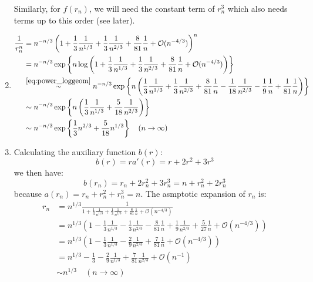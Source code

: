 \begin{solution}
\begin{enumerate}[label=(\alph*)]
        Similarly, for $f(r_n)$, we will need the constant term of $r_n^3$ which also needs terms up to this order (see later).
        \item \begin{align*}
            \frac{1}{r_n^n} &= n^{-n/3} \left(1 + \frac{1}{3}\frac{1}{n^{1/3}}+\frac{1}{3}\frac{1}{n^{2/3}}+\frac{8}{81}\frac{1}{n}+ \mathcal{O}(n^{-4/3})\right)^n  \\
            &=  n^{-n/3} \exp\left\{n \log\left(1 + \frac{1}{3}\frac{1}{n^{1/3}}+\frac{1}{3}\frac{1}{n^{2/3}}+\frac{8}{81}\frac{1}{n}+ \mathcal{O}(n^{-4/3})\right)\right\} \\
            &\overset{\eqref{eq:power_loggeom}}{\sim} n^{-n/3} \exp\left\{n\left( \frac{1}{3}\frac{1}{n^{1/3}} + \frac{1}{3}\frac{1}{n^{2/3}} + \frac{8}{81}\frac{1}{n} - \frac{1}{18} \frac{1}{n^{2/3}} - \frac{1}{9}\frac{1}{n} + \frac{1}{81}\frac{1}{n}\right) \right\} \\
            &\sim n^{-n/3} \exp\left\{n\left(\frac{1}{3}\frac{1}{n^{1/3}}+\frac{5}{18}\frac{1}{n^{2/3}}\right) \right\} \\
            &\sim n^{-n/3} \exp\left\{ \frac{1}{3}n^{2/3} + \frac{5}{18}n^{1/3}\right\}  \quad (n\to \infty)
        \end{align*}
        \item Calculating the auxiliary function $b(r)$:
        \[
            b(r) = ra'(r) = r + 2r^2 + 3r^3
        \]
        we then have:
        \[
            b(r_n) = r_n + 2r_n^2 + 3r_n^3 = n + r_n^2 +2r_n^3
        \]
        because $a(r_n) = r_n+r_n^2+r_n^3 = n$. The asmptotic expansion of $r_n$ is:
        \begin{align*}
            r_n &= n^{1/3} \frac{1}{1 + \frac{1}{3}\frac{1}{n^{1/3}}+\frac{1}{3}\frac{1}{n^{2/3}}+\frac{8}{81}\frac{1}{n} + \mathcal{O}(n^{-4/3})} \\
            &= n^{1/3} \left(1 - \frac{1}{3}\frac{1}{n^{1/3}} - \frac{1}{3}\frac{1}{n^{2/3}} - \frac{8}{81}\frac{1}{n} + \frac{1}{9}\frac{1}{n^{2/3}} + \frac{5}{27}\frac{1}{n} + \mathcal{O}(n^{-4/3})\right) \\
            &= n^{1/3} \left(1 - \frac{1}{3}\frac{1}{n^{1/3}} - \frac{2}{9}\frac{1}{n^{2/3}} +\frac{7}{81}\frac{1}{n} + \mathcal{O}(n^{-4/3}) \right) \\
            &= n^{1/3} - \frac{1}{3} - \frac{2}{9}\frac{1}{n^{1/3}} + \frac{7}{81}\frac{1}{n^{2/3}} + \mathcal{O}(n^{-1}) \\
            & \sim n^{1/3} \quad (n\to \infty)
        \end{align*}

\end{enumerate}
\end{solution}
